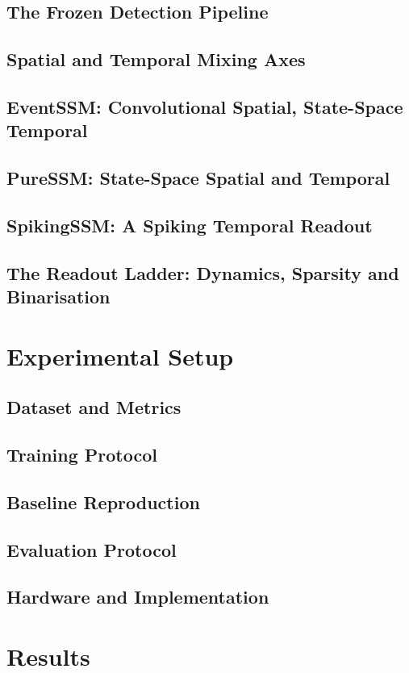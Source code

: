 \documentclass[11pt,a4paper]{article}
\begin{document}
\subsection{The Frozen Detection Pipeline}
\subsection{Spatial and Temporal Mixing Axes}
\subsection{EventSSM: Convolutional Spatial, State-Space Temporal}
\subsection{PureSSM: State-Space Spatial and Temporal}
\subsection{SpikingSSM: A Spiking Temporal Readout}
\subsection{The Readout Ladder: Dynamics, Sparsity and Binarisation}

\section{Experimental Setup}
\subsection{Dataset and Metrics}
\subsection{Training Protocol}
\subsection{Baseline Reproduction}
\subsection{Evaluation Protocol}
\subsection{Hardware and Implementation}

\section{Results}
\end{document}
